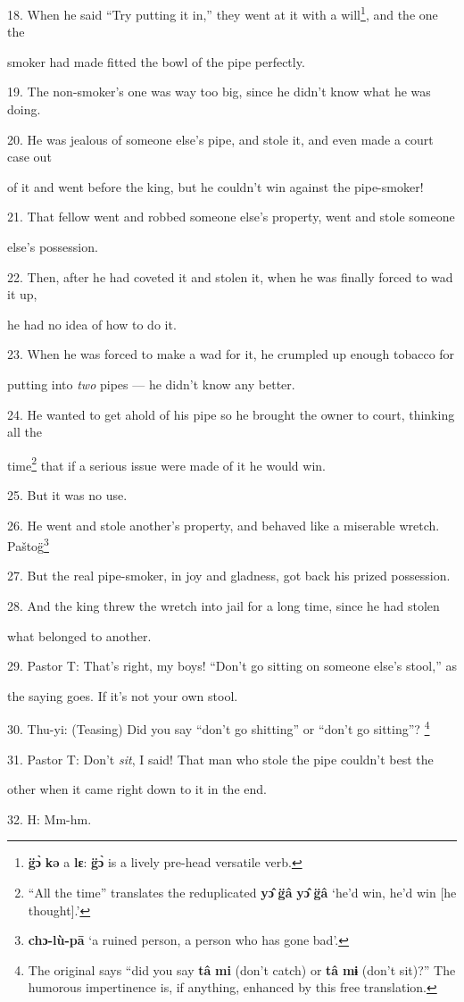 18. When he said ``Try putting it in,'' they went at it with a will\footnote{\textbf{g̈ɔ̀} \textbf{kə} a \textbf{lɛ}: \textbf{g̈ɔ̀} is a lively pre-head versatile verb.}, and the
one the

smoker had made fitted the bowl of the pipe perfectly.

19. The non-smoker's one was way too big, since he didn't know what he was doing.

20. He was jealous of someone else's pipe, and stole it, and even made a court
case out

of it and went before the king, but he couldn't win against the pipe-smoker!

21. That fellow went and robbed someone else's property, went and stole someone


else's possession.

22. Then, after he had coveted it and stolen it, when he was finally forced to
wad it up,

he had no idea of how to do it.

23. When he was forced to make a wad for it, he crumpled up enough tobacco for


putting into \textit{two }pipes --- he didn't know any better.

24. He wanted to get ahold of his pipe so he brought the owner to court, thinking
all the

time\footnote{``All the time'' translates the reduplicated \textbf{yɔ̂} \textbf{g̈â} \textbf{yɔ̂} \textbf{g̈â} `he'd win, he'd win [he thought].'} that if a serious issue were made of it he would win.

25. But it was no use.

26. He went and stole another's property, and behaved like a miserable wretch.
Paštog̈\footnote{\textbf{chɔ-lù-pā} `a ruined person, a person who has gone bad'.}

27. But the real pipe-smoker, in joy and gladness, got back his prized possession.

28. And the king threw the wretch into jail for a long time, since he had stolen


what belonged to another.

29. Pastor T: That's right, my boys! ``Don't go sitting on someone else's
stool,'' as

the saying goes. If it's not your own stool.

30. Thu-yi: (Teasing) Did you say ``don't go shitting'' or ``don't go sitting''?
\footnote{The original says ``did you say \textbf{tâ} \textbf{mi} (don't catch) or \textbf{tâ} \textbf{mɨ} (don't sit)?'' The humorous impertinence is, if anything, enhanced by this free translation.}

31. Pastor T: Don't \textit{sit}, I said! That man who stole the pipe couldn't
best the

other when it came right down to it in the end.

32. H: Mm-hm.

